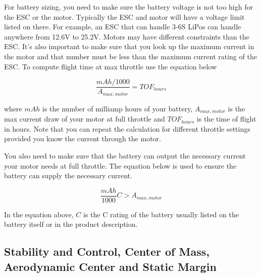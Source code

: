 For battery sizing, you need to make sure the battery voltage is not
too high for the ESC or the motor. Typically the ESC and motor will
have a voltage limit listed on there. For example, an ESC that can
handle 3-6S LiPos can handle anywhere from 12.6V to 25.2V. Motors may
have different constraints than the ESC. It's also important to make
sure that you look up the maximum current in the motor and that number
must be less than the maximum current rating of the ESC. To compute
flight time at max throttle use the equation below

\begin{equation}
  \frac{mAh/1000}{A_{max,motor}} = TOF_{hours}
\end{equation}

where $mAh$ is the number of milliamp hours of your battery,
$A_{max,motor}$ is the max current draw of your motor at full throttle
and $TOF_{hours}$ is the time of flight in hours. Note that you can
repeat the calculation for different throttle settings provided you
know the current through the motor. 

You also need to make sure that the battery can output the necessary
current your motor needs at full throttle. The equation below is used
to ensure the battery can supply the necessary current. 

\begin{equation}
\frac{mAh}{1000}C > A_{max,motor}
\end{equation}

In the equation above, $C$ is the C rating of the battery usually
listed on the battery itself or in the product description.

\subsection{Stability and Control, Center of Mass, Aerodynamic Center and Static Margin}

